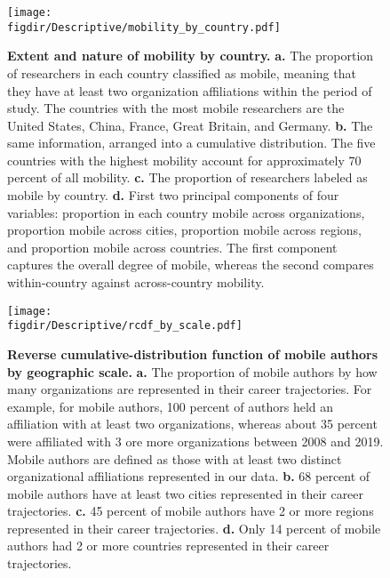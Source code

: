 \documentclass[12pt]{article} %
\def\figdir{../Figs}
\begin{document}
%
%
\begin{figure}[p!]
	\centering
	\texttt{[image: \\figdir/Descriptive/mobility\_by\_country.pdf]}
	\caption{
		\textbf{Extent and nature of mobility by country.}
		\textbf{a.}
		The proportion of researchers in each country classified as mobile, meaning that they have at least two organization affiliations within the period of study.
		The countries with the most mobile researchers are the United States, China, France, Great Britain, and Germany.
		\textbf{b.}
		The same information, arranged into a cumulative distribution.
		The five countries with the highest mobility account for approximately 70 percent of all mobility.
		\textbf{c.} The proportion of researchers labeled as mobile by country.
		\textbf{d.} First two principal components of four variables: proportion in each country mobile across organizations, proportion mobile across cities, proportion mobile across regions, and proportion mobile across countries.
		The first component captures the overall degree of mobile, whereas the second compares within-country against across-country mobility.
	}
	\label{fig:supp:descriptives}
\end{figure}




\newpage
%
%
\begin{figure}[p!]
	\centering
	\texttt{[image: \\figdir/Descriptive/rcdf\_by\_scale.pdf]}
	\caption{
		\textbf{Reverse cumulative-distribution function of mobile authors by geographic scale.}
		\textbf{a.}
		The proportion of mobile authors by how many organizations are represented in their career trajectories.
		For example, for mobile authors, 100 percent of authors held an affiliation with at least two organizations, whereas about 35 percent were affiliated with 3 ore more organizations between 2008 and 2019.
		Mobile authors are defined as those with at least two distinct organizational affiliations represented in our data.
		\textbf{b.} 68 percent of mobile authors have at least two cities represented in their career trajectories.
		\textbf{c.} 45 percent of mobile authors have 2 or more regions represented in their career trajectories.
		\textbf{d.} Only 14 percent of mobile authors had 2 or more countries represented in their career trajectories.
	}
	\label{fig:supp:rcdf_by_scale}
\end{figure}
\end{document}
